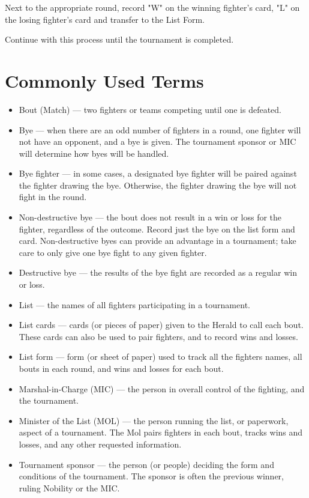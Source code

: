 \documentclass{article}
\begin{document}
Next to the appropriate round, record "W" on the winning fighter’s card, "L" on the losing fighter’s card
and transfer to the List Form.

Continue with this process until the tournament is completed.

\section{Commonly Used Terms}

\begin{itemize}
\item Bout (Match) --- two fighters or teams competing until one is defeated.
\item Bye --- when there are an odd number of fighters in a round, one fighter will not have an opponent, and
a bye is given. The tournament sponsor or MIC will determine how byes will be handled.
\item Bye fighter --- in some cases, a designated bye fighter will be paired against the fighter drawing
the bye. Otherwise, the fighter drawing the bye will not fight in the round.
\item Non-destructive bye --- the bout does not result in a win or loss for the fighter, regardless of the
outcome. Record just the bye on the list form and card. Non-destructive byes can provide an
advantage in a tournament; take care to only give one bye fight to any given fighter.
\item Destructive bye --- the results of the bye fight are recorded as a regular win or loss.
\item List --- the names of all fighters participating in a tournament.
\item List cards --- cards (or pieces of paper) given to the Herald to call each bout. These cards can also be
used to pair fighters, and to record wins and losses.
\item List form --- form (or sheet of paper) used to track all the fighters names, all bouts in each round, and
wins and losses for each bout.
\item Marshal-in-Charge (MIC) --- the person in overall control of the fighting, and the tournament.
\item Minister of the List (MOL) --- the person running the list, or paperwork, aspect of a tournament. The
Mol pairs fighters in each bout, tracks wins and losses, and any other requested information.
\item Tournament sponsor --- the person (or people) deciding the form and conditions of the tournament.
The sponsor is often the previous winner, ruling Nobility or the MIC.
\end{itemize}
\end{document}
